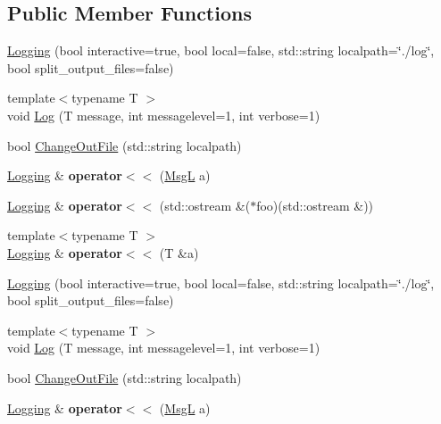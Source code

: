 \subsection*{Public Member Functions}
\begin{DoxyCompactItemize}
\item 
\hyperlink{classLogging_a7a3c6bcf0b0241779e7f500e29162e5e}{Logging} (bool interactive=true, bool local=false, std\-::string localpath=\char`\"{}./log\char`\"{}, bool split\-\_\-output\-\_\-files=false)
\item 
{\footnotesize template$<$typename T $>$ }\\void \hyperlink{classLogging_af7839ee68729b066da269cc012b1fcc9}{Log} (T message, int messagelevel=1, int verbose=1)
\item 
bool \hyperlink{classLogging_a7a0c89c152ad81fb41a849ed9d81e429}{Change\-Out\-File} (std\-::string localpath)
\item 
\hypertarget{classLogging_aed3d056a85b2bee70f31752595397a60}{\hyperlink{classLogging}{Logging} \& {\bfseries operator$<$$<$} (\hyperlink{structMsgL}{Msg\-L} a)}\label{classLogging_aed3d056a85b2bee70f31752595397a60}

\item 
\hypertarget{classLogging_adcbbc7dc2221a2f5fb88dc68089fb91c}{\hyperlink{classLogging}{Logging} \& {\bfseries operator$<$$<$} (std\-::ostream \&($\ast$foo)(std\-::ostream \&))}\label{classLogging_adcbbc7dc2221a2f5fb88dc68089fb91c}

\item 
\hypertarget{classLogging_a4e1557aba6b12232714eead91264587e}{{\footnotesize template$<$typename T $>$ }\\\hyperlink{classLogging}{Logging} \& {\bfseries operator$<$$<$} (T \&a)}\label{classLogging_a4e1557aba6b12232714eead91264587e}

\item 
\hyperlink{classLogging_a7a3c6bcf0b0241779e7f500e29162e5e}{Logging} (bool interactive=true, bool local=false, std\-::string localpath=\char`\"{}./log\char`\"{}, bool split\-\_\-output\-\_\-files=false)
\item 
{\footnotesize template$<$typename T $>$ }\\void \hyperlink{classLogging_af7839ee68729b066da269cc012b1fcc9}{Log} (T message, int messagelevel=1, int verbose=1)
\item 
bool \hyperlink{classLogging_a7a0c89c152ad81fb41a849ed9d81e429}{Change\-Out\-File} (std\-::string localpath)
\item 
\hypertarget{classLogging_aed3d056a85b2bee70f31752595397a60}{\hyperlink{classLogging}{Logging} \& {\bfseries operator$<$$<$} (\hyperlink{structMsgL}{Msg\-L} a)}\label{classLogging_aed3d056a85b2bee70f31752595397a60}


\end{DoxyCompactItemize}
